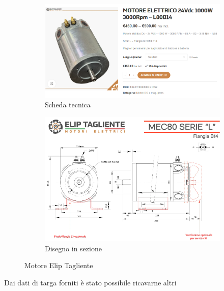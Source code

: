 \documentclass[a4paper,12pt]{article}
\begin{document}
\begin{figure}[h!]
    \centering
    \begin{subfigure}[b]{0.45\textwidth}
        \centering
        \includegraphics[width=\linewidth]{Immagini/Altre/motoreElipTagliente.PNG}
        \caption{Scheda tecnica}
        \label{fig:motore1}
    \end{subfigure}
    \hfill
    \begin{subfigure}[b]{0.45\textwidth}
        \centering
        \includegraphics[width=\linewidth]{Immagini/Altre/motoreElipTaglienteDisegno.PNG}
        \caption{Disegno in sezione}
        \label{fig:motore2}
    \end{subfigure}
    \caption{Motore Elip Tagliente}
    \label{fig:Motore1+2}
\end{figure}

\vspace{0.5em}


Dai dati di targa forniti è stato possibile ricavarne altri
\end{document}
